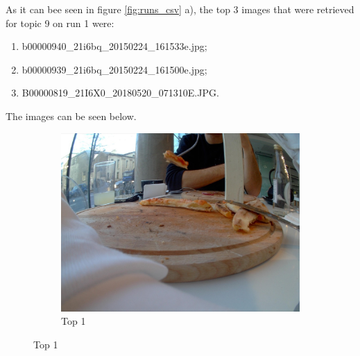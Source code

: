 As it can bee seen in figure \ref{fig:runs_csv} a), the top 3 images that were retrieved for topic 9 on run 1 were:
\begin{enumerate}
  \itemsep0em
  \item b00000940\_21i6bq\_20150224\_161533e.jpg;
  \item b00000939\_21i6bq\_20150224\_161500e.jpg;
  \item B00000819\_21I6X0\_20180520\_071310E.JPG.
\end{enumerate}
 
The images can be seen below.

\begin{figure}[H]
  \centering
  \captionsetup{justification=centering}

  \begin{subfigure}{0.32\textwidth}
  \includegraphics[width=\textwidth]{Sections/7Results/images/top1.jpg} 
  \caption{Top 1}


\end{subfigure}
\end{figure}
